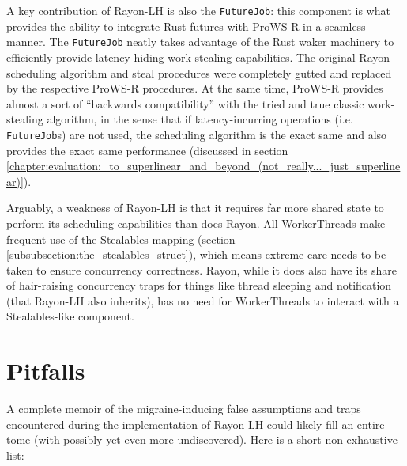 \documentclass[bsc,frontabs,singlespacing,parskip,deptreport,normalheadings]{infthesis}
\begin{document}
A key contribution of Rayon-LH is also the \texttt{FutureJob}: this component is
what provides the ability to integrate Rust futures with ProWS-R in a seamless
manner. The \texttt{FutureJob} neatly takes advantage of the Rust waker
machinery to efficiently provide latency-hiding work-stealing capabilities. The
original Rayon scheduling algorithm and steal procedures were completely gutted
and replaced by the respective ProWS-R procedures. At the same time, ProWS-R
provides almost a sort of ``backwards compatibility'' with the tried and true
classic work-stealing algorithm, in the sense that if latency-incurring
operations (i.e. \texttt{FutureJob}s) are not used, the scheduling algorithm is
the exact same and also provides the exact same performance (discussed in
section
\ref{chapter:evaluation:_to_superlinear_and_beyond_(not_really..._just_superlinear)}).

Arguably, a weakness of Rayon-LH is that it requires far more shared state to
perform its scheduling capabilities than does Rayon. All WorkerThreads make
frequent use of the Stealables mapping (section
\ref{subsubsection:the_stealables_struct}), which means extreme care needs to be
taken to ensure concurrency correctness. Rayon, while it does also have
its share of hair-raising concurrency traps for things like thread sleeping and
notification (that Rayon-LH also inherits), has no need for WorkerThreads to
interact with a Stealables-like component.

\section{Pitfalls}

A complete memoir of the migraine-inducing false assumptions and traps
encountered during the implementation of Rayon-LH could likely fill an entire
tome (with possibly yet even more undiscovered). Here is a short non-exhaustive
list:
\end{document}
